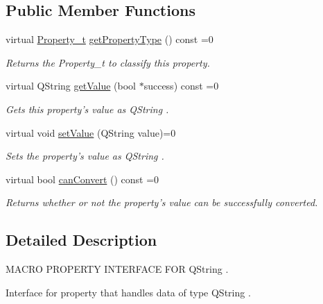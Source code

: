 \subsection*{Public Member Functions}
\begin{DoxyCompactItemize}
\item 
virtual \hyperlink{group___property_classes_ga38f1ccddda12c7cb50b868c9f789ee37}{Property\-\_\-t} \hyperlink{class_i_string_property_a6746c253e1664d4282f3d614b0bb36fe}{get\-Property\-Type} () const =0
\begin{DoxyCompactList}\small\item\em Returns the Property\-\_\-t to classify this property. \end{DoxyCompactList}\item 
virtual Q\-String \hyperlink{class_i_string_property_a0dbe79993973e018510325120762504f}{get\-Value} (bool $\ast$success) const =0
\begin{DoxyCompactList}\small\item\em Gets this property's value as Q\-String . \end{DoxyCompactList}\item 
virtual void \hyperlink{class_i_string_property_a300b7403e9ce2929dabb5bb62d11142d}{set\-Value} (Q\-String value)=0
\begin{DoxyCompactList}\small\item\em Sets the property's value as Q\-String . \end{DoxyCompactList}\item 
virtual bool \hyperlink{class_i_string_property_a2fcab392710db1ae140e394c1db6739e}{can\-Convert} () const =0
\begin{DoxyCompactList}\small\item\em Returns whether or not the property's value can be successfully converted. \end{DoxyCompactList}\end{DoxyCompactItemize}


\subsection{Detailed Description}
M\-A\-C\-R\-O P\-R\-O\-P\-E\-R\-T\-Y I\-N\-T\-E\-R\-F\-A\-C\-E F\-O\-R Q\-String . 

Interface for property that handles data of type Q\-String . 

